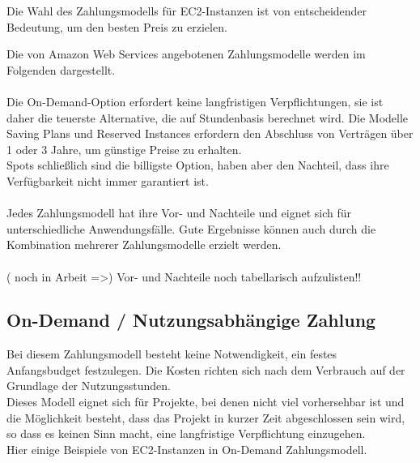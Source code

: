 Die Wahl des Zahlungsmodells für EC2-Instanzen ist von entscheidender Bedeutung, um den besten Preis zu erzielen.

Die von Amazon Web Services angebotenen Zahlungsmodelle werden im Folgenden dargestellt.
\\\\
Die On-Demand-Option erfordert keine langfristigen Verpflichtungen, sie ist daher die teuerste Alternative, die auf Stundenbasis berechnet wird. Die Modelle Saving Plans und Reserved Instances erfordern den Abschluss von Verträgen über 1 oder 3 Jahre, um günstige Preise zu erhalten.
\\
Spots schließlich sind die billigste Option, haben aber den Nachteil, dass ihre Verfügbarkeit nicht immer garantiert ist.
\\\\
Jedes Zahlungsmodell hat ihre Vor- und Nachteile und eignet sich für unterschiedliche Anwendungsfälle. Gute Ergebnisse können auch durch die Kombination mehrerer Zahlungsmodelle erzielt werden.
\\\\
( noch in Arbeit =>)
Vor- und Nachteile noch tabellarisch aufzulisten!!


\subsection{On-Demand / Nutzungsabhängige Zahlung}
Bei diesem Zahlungsmodell besteht keine Notwendigkeit, ein festes Anfangsbudget festzulegen. Die Kosten richten sich nach dem Verbrauch auf der Grundlage der Nutzungsstunden.
\\
Dieses Modell eignet sich für Projekte, bei denen nicht viel vorhersehbar ist und die Möglichkeit besteht, dass das Projekt in kurzer Zeit abgeschlossen sein wird, so dass es keinen Sinn macht, eine langfristige Verpflichtung einzugehen.
\\
Hier einige Beispiele von EC2-Instanzen in On-Demand Zahlungsmodell.

